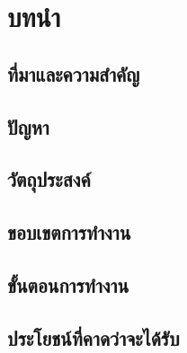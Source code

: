 \section{บทนำ}

\subsection{ที่มาและความสำคัญ}

\subsection{ปัญหา}

\subsection{วัตถุประสงค์}

\subsection{ขอบเขตการทำงาน}

\subsection{ขั้นตอนการทำงาน}

\subsection{ประโยชน์ที่คาดว่าจะได้รับ}
